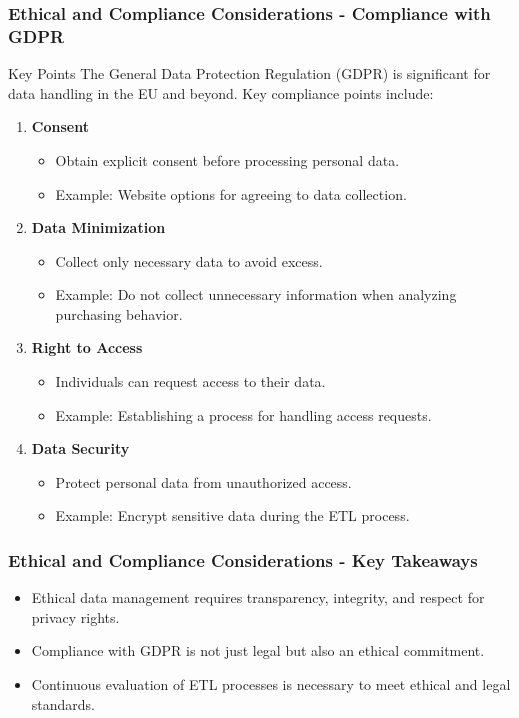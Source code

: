 \documentclass[aspectratio=169]{beamer}
\begin{document}
\begin{frame}[fragile]
    \frametitle{Ethical and Compliance Considerations - Compliance with GDPR}
    \begin{block}{Key Points}
        The General Data Protection Regulation (GDPR) is significant for data handling in the EU and beyond. Key compliance points include:
    \end{block}
    \begin{enumerate}
        \item \textbf{Consent}
            \begin{itemize}
                \item Obtain explicit consent before processing personal data.
                \item Example: Website options for agreeing to data collection.
            \end{itemize}
        \item \textbf{Data Minimization}
            \begin{itemize}
                \item Collect only necessary data to avoid excess.
                \item Example: Do not collect unnecessary information when analyzing purchasing behavior.
            \end{itemize}
        \item \textbf{Right to Access}
            \begin{itemize}
                \item Individuals can request access to their data.
                \item Example: Establishing a process for handling access requests.
            \end{itemize}
        \item \textbf{Data Security}
            \begin{itemize}
                \item Protect personal data from unauthorized access.
                \item Example: Encrypt sensitive data during the ETL process.
            \end{itemize}
    \end{enumerate}
\end{frame}

\begin{frame}[fragile]
    \frametitle{Ethical and Compliance Considerations - Key Takeaways}
    \begin{itemize}
        \item Ethical data management requires transparency, integrity, and respect for privacy rights.
        \item Compliance with GDPR is not just legal but also an ethical commitment.
        \item Continuous evaluation of ETL processes is necessary to meet ethical and legal standards.
    \end{itemize}
\end{frame}
\end{document}
